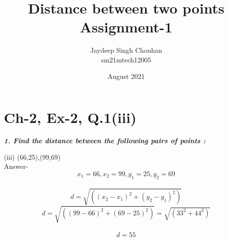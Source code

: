 \documentclass[20pts]{article}
\title{\textbf{\huge Distance between two points\\ Assignment-1}}
\author{ Jaydeep Singh Chouhan\\ sm21mtech12005}
\date{August 2021}
\begin{document}
\maketitle{}

\section{Ch-2, Ex-2, Q.1(iii)}
\vspace{1cm}

\textbf{\textsl{1. Find the distance between the following pairs of points :}}

\vspace{1cm}
(iii) (66,25),(99,69)\\

  Answer- $$ x_1=66 ,x_2=99 ,y_1=25,y_2=69$$\\
$$ d=\sqrt{((x_2-x_1)^2+(y_2-y_1)^2)}$$
\vspace{0.2cm}
$$ d=\sqrt{((99-66)^2 + (69-25)^2)}=\sqrt{(33^2 + 44^2)}$$\\
$$ d= 55$$
\end{document}
